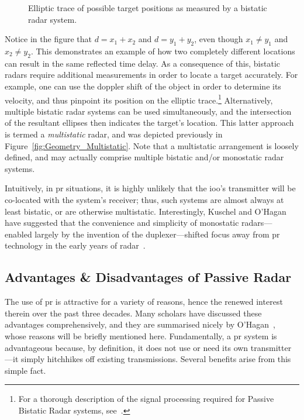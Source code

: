 \documentclass[class=report,11pt,crop=false]{standalone}
\begin{document}
\begin{figure}
    \centering
    \captionsetup{type=figure}
    \def\svgwidth{0.5\linewidth}
    {\scriptsize
        }
    \caption{Elliptic trace of possible target positions as measured by a bistatic radar system.}
    \label{fig:Elliptic_Curve}
\end{figure}

Notice in the figure that \(d = x_1 + x_2\) and \(d = y_1 + y_2\), even though \(x_1 \ne y_1\) and \(x_2 \ne y_2\). This demonstrates an example of how two completely different locations can result in the same reflected time delay. As a consequence of this, bistatic radars require additional measurements in order to locate a target accurately. For example, one can use the doppler shift of the object in order to determine its velocity, and thus pinpoint its position on the elliptic trace.\footnote{For a thorough description of the signal processing required for Passive Bistatic Radar systems, see~\cite{Malanowski2019}.} Alternatively, multiple bistatic radar systems can be used simultaneously, and the intersection of the resultant ellipses then indicates the target's location. This latter approach is termed a \emph{multistatic} radar, and was depicted previously in Figure~\ref{fig:Geometry_Multistatic}. Note that a multistatic arrangement is loosely defined, and may actually comprise multiple bistatic and/or monostatic radar systems. 

Intuitively, in \gls{pr} situations, it is highly unlikely that the \gls{ioo}'s transmitter will be co-located with the system's receiver; thus, such systems are almost always at least bistatic, or are otherwise multistatic. Interestingly, Kuschel and O'Hagan have suggested that the convenience and simplicity of monostatic radars---enabled largely by the invention of the duplexer---shifted focus away from \gls{pr} technology in the early years of radar~\cite{kuschel-hagan-history}.

\subsection{Advantages \& Disadvantages of Passive Radar}
The use of \gls{pr} is attractive for a variety of reasons, hence the renewed interest therein over the past three decades. Many scholars have discussed these advantages comprehensively, and they are summarised nicely by O'Hagan~\cite{o2009passive}, whose reasons will be briefly mentioned here. Fundamentally, a \gls{pr} system is advantageous because, by definition, it does not use or need its own transmitter---it simply hitchhikes off existing transmissions. Several benefits arise from this simple fact.
\end{document}
